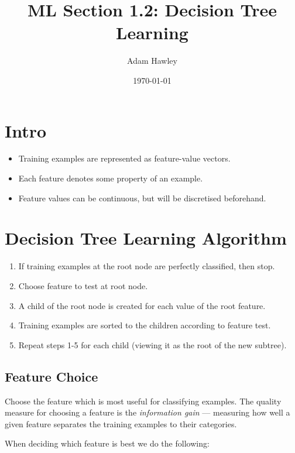 \documentclass[11pt]{article}
\author{Adam Hawley}
\date{\today}
\title{ML Section 1.2: Decision Tree Learning}
\begin{document}
\maketitle
\tableofcontents


\section{Intro}
\label{sec:org070c72e}
\begin{itemize}
\item Training examples are represented as feature-value vectors.
\item Each feature denotes some property of an example.
\item Feature values can be continuous, but will be discretised beforehand.
\end{itemize}

\section{Decision Tree Learning Algorithm}
\label{sec:orgb9098c0}
\begin{enumerate}
\item If training examples at the root node are perfectly classified, then stop.
\item Choose feature to test at root node.
\item A child of the root node is created for each value of the root feature.
\item Training examples are sorted to the children according to feature test.
\item Repeat steps 1-5 for each child (viewing it as the root of the new subtree).
\end{enumerate}

\subsection{Feature Choice}
\label{sec:org79c1dbd}
Choose the feature which is most useful for classifying examples.
The quality measure for choosing a feature is the \emph{information gain} --- measuring how well a given feature separates the training examples to their categories.

When deciding which feature is best we do the following:
\end{document}
